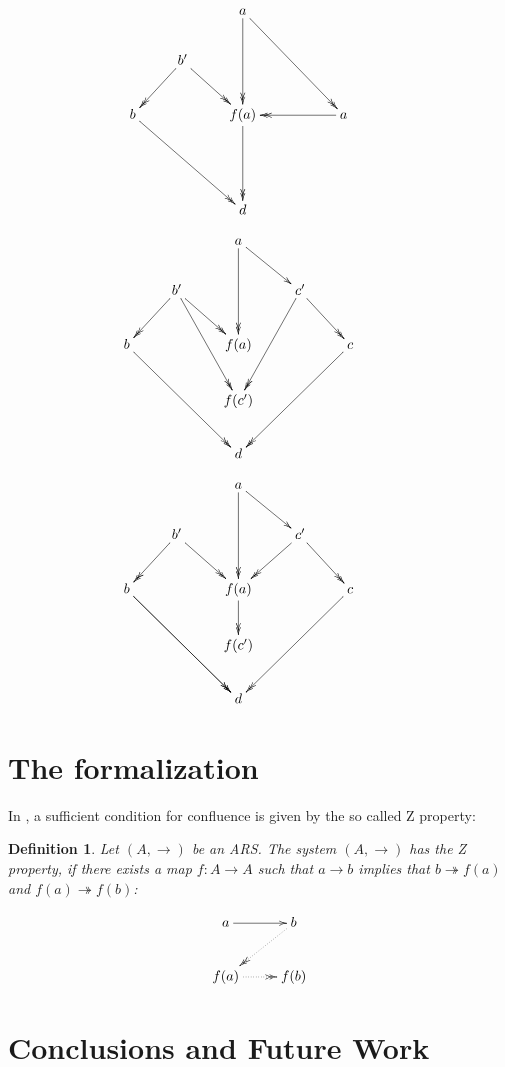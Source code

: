 \documentclass[11pt]{article}
\newtheorem{definition}{Definition}[section]
\newcommand{\tto}{\twoheadrightarrow}
\begin{document}
\[
      \xymatrix{
        & & a \ar@{->>}[dd] \ar@{->>}[ddrr] & & \\
        & b' \ar@{->>}[dl] \ar@{->>}[dr] & & & \\
        b \ar@{->>}[ddrr] & & f(a) \ar@{->>}[dd] & &  a \ar@{->>}[ll] \\
        & & & & & \\
        & & d & &
      }
    \]

\[
       \xymatrix{
        & & a \ar@{->>}[dd] \ar@{->}[dr] & & \\
        & b' \ar@{->>}[dl] \ar@{->>}[dr] \ar@[blue]@{->>}[ddr] & & c' \ar@{->>}[dr] \ar@[blue]@{->>}[ddl] & \\
        b \ar@[red]@{->>}[ddrr] & & f(a) & &  c  \ar@[red]@{->>}[ddll] \\
        & & f(c') & & & \\
        & & d  & & 
      }
     \]

\[
       \xymatrix{
        & & a \ar@{->>}[dd] \ar@{->}[dr] & & \\
        & b' \ar@{->>}[dl] \ar@{->>}[dr] & & c' \ar@{->>}[dr] \ar@{->>}[dl] & \\
        b \ar@{->>}[ddrr] \ar@{->>}[ddrr] & & f(a) \ar@{->>}[d] & &  c  \ar@{->>}[ddll] \\
        & & f(c') & & & \\
        & & d  & & 
      }
     \]
\section{The formalization}
\label{sec:org9727d04}

In \cite{ZPropertyDraft}, a sufficient condition for confluence is given
by the so called Z property:

\begin{definition}
Let \((A,\to)\) be an ARS. The system \((A,\to)\) has the Z property,
if there exists a map \(f:A \to A\) such that \(a \to b\) implies
that \(b \tto f(a)\) and \(f(a) \tto f(b)\):

\[
  \xymatrix{
   a \ar[r] &  b \ar@{.>>}[dl]\\
   f(a) \ar@{.>>}[r] & f(b) \\ 
  }
 \]
\end{definition}


\section{Conclusions and Future Work}
\label{sec:org0712535}


 
\end{document}
